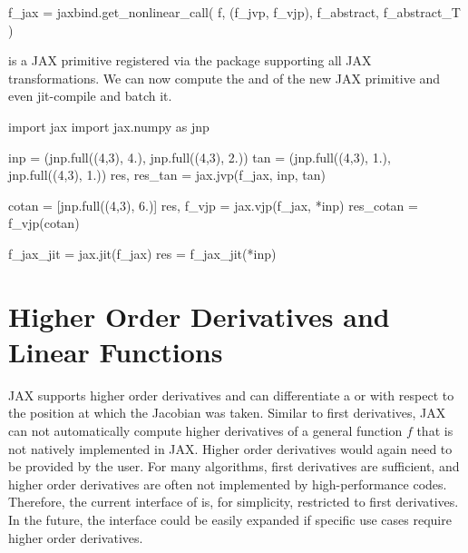 \documentclass[10pt,a4paper,onecolumn]{article}
\let\textttOrig=\texttt
\def\texttt#1{\expandafter\textttOrig{\seqsplit{#1}}}
\newenvironment{Shaded}{}{}
\newcommand{\DecValTok}[1]{\textcolor[rgb]{0.25,0.63,0.44}{#1}}
\newcommand{\FloatTok}[1]{\textcolor[rgb]{0.25,0.63,0.44}{#1}}
\newcommand{\ImportTok}[1]{#1}
\newcommand{\NormalTok}[1]{#1}
\newcommand{\OperatorTok}[1]{\textcolor[rgb]{0.40,0.40,0.40}{#1}}
\begin{document}
\begin{Shaded}
\begin{Highlighting}[]
\NormalTok{f\_jax }\OperatorTok{=}\NormalTok{ jaxbind.get\_nonlinear\_call(}
\NormalTok{    f, (f\_jvp, f\_vjp), f\_abstract, f\_abstract\_T}
\NormalTok{)}
\end{Highlighting}
\end{Shaded}

\texttt{f\_jax} is a JAX primitive registered via the \texttt{JAXbind}
package supporting all JAX transformations. We can now compute the
\texttt{jvp} and \texttt{vjp} of the new JAX primitive and even
jit-compile and batch it.

\begin{Shaded}
\begin{Highlighting}[]
\ImportTok{import}\NormalTok{ jax}
\ImportTok{import}\NormalTok{ jax.numpy }\ImportTok{as}\NormalTok{ jnp}

\NormalTok{inp }\OperatorTok{=}\NormalTok{ (jnp.full((}\DecValTok{4}\NormalTok{,}\DecValTok{3}\NormalTok{), }\FloatTok{4.}\NormalTok{), jnp.full((}\DecValTok{4}\NormalTok{,}\DecValTok{3}\NormalTok{), }\FloatTok{2.}\NormalTok{))}
\NormalTok{tan }\OperatorTok{=}\NormalTok{ (jnp.full((}\DecValTok{4}\NormalTok{,}\DecValTok{3}\NormalTok{), }\FloatTok{1.}\NormalTok{), jnp.full((}\DecValTok{4}\NormalTok{,}\DecValTok{3}\NormalTok{), }\FloatTok{1.}\NormalTok{))}
\NormalTok{res, res\_tan }\OperatorTok{=}\NormalTok{ jax.jvp(f\_jax, inp, tan)}

\NormalTok{cotan }\OperatorTok{=}\NormalTok{ [jnp.full((}\DecValTok{4}\NormalTok{,}\DecValTok{3}\NormalTok{), }\FloatTok{6.}\NormalTok{)]}
\NormalTok{res, f\_vjp }\OperatorTok{=}\NormalTok{ jax.vjp(f\_jax, }\OperatorTok{*}\NormalTok{inp)}
\NormalTok{res\_cotan }\OperatorTok{=}\NormalTok{ f\_vjp(cotan)}

\NormalTok{f\_jax\_jit }\OperatorTok{=}\NormalTok{ jax.jit(f\_jax)}
\NormalTok{res }\OperatorTok{=}\NormalTok{ f\_jax\_jit(}\OperatorTok{*}\NormalTok{inp)}
\end{Highlighting}
\end{Shaded}

\hypertarget{higher-order-derivatives-and-linear-functions}{%
\section{Higher Order Derivatives and Linear
Functions}\label{higher-order-derivatives-and-linear-functions}}

JAX supports higher order derivatives and can differentiate a
\texttt{jvp} or \texttt{vjp} with respect to the position at which the
Jacobian was taken. Similar to first derivatives, JAX can not
automatically compute higher derivatives of a general function \(f\)
that is not natively implemented in JAX. Higher order derivatives would
again need to be provided by the user. For many algorithms, first
derivatives are sufficient, and higher order derivatives are often not
implemented by high-performance codes. Therefore, the current interface
of \texttt{JAXbind} is, for simplicity, restricted to first derivatives.
In the future, the interface could be easily expanded if specific use
cases require higher order derivatives.
\end{document}
